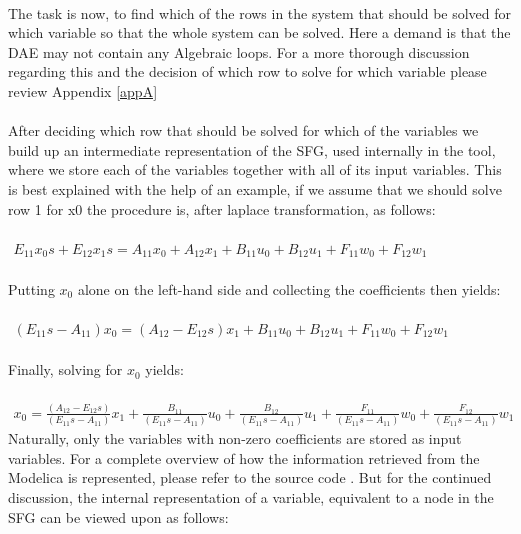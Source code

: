 \\\newline The task is now, to find which of the rows in the system that should be solved for which variable so that the whole system can be solved. Here a demand is that the DAE may not contain any Algebraic loops. For a more thorough discussion regarding this and the decision of which row to solve for which variable please review Appendix \ref{appA}\\\\After deciding which row that should be solved for which of the variables we build up an intermediate representation of the SFG, used internally in the tool, where we store each of the variables together with all of its input variables. This is best explained with the help of an example, if we assume that we should solve row 1 for x0 the procedure is, after laplace transformation, as follows:\\\\$\begin{array}{rcl} E_{11}x_0s  +E_{12}x_1s=A_{11}x_0  +A_{12}x_1 +B_{11}u_0  +B_{12}u_1  +F_{11}w_0  +F_{12}w_1 \end{array}$\\
\\Putting $x_0$ alone on the left-hand side and collecting the coefficients then yields:\\\\$\begin{array}{rcl} (E_{11}s-A_{11})x_0  =(A_{12}-E_{12}s)x_1 +B_{11}u_0  +B_{12}u_1 +F_{11}w_0  +F_{12}w_1 \end{array}$\\\\
Finally, solving for $x_0$ yields:\\\\
$\begin{array}{rcl} x_0  = \frac{(A_{12}-E_{12}s)}{(E_{11}s-A_{11})}x_1 +\frac{B_{11}}{(E_{11}s-A_{11})}u_0  +\frac{B_{12}}{(E_{11}s-A_{11})}u_1 +\frac{F_{11}}{(E_{11}s-A_{11})}w_0 +\frac{F_{12}}{(E_{11}s-A_{11})}w_1\end{array}$\\\newline Naturally, only the variables with non-zero coefficients are stored as input variables. For a complete overview of how the information retrieved from the Modelica is represented, please refer to the source code \cite{githabb}\nocite{*}. But for the continued discussion, the internal representation of a variable, equivalent to a node in the SFG can be viewed upon as follows:\\\newline
